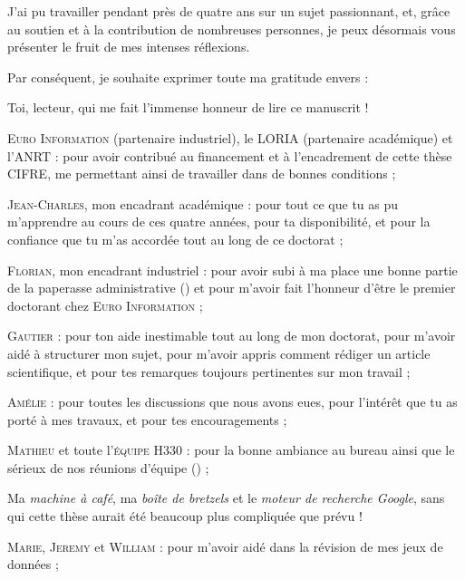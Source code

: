 \begin{ThesisAcknowledgments}

	J'ai pu travailler pendant près de quatre ans sur un sujet passionnant, et, grâce au soutien et à la contribution de nombreuses personnes, je peux désormais vous présenter le fruit de mes intenses réflexions.
	
	Par conséquent, je souhaite exprimer toute ma gratitude envers :
	\begin{todolist}
		\item[\itemok] Toi, lecteur, qui me fait l'immense honneur de lire ce manuscrit ! \faThumbsUp
		\item[\itemok] \textsc{Euro Information} (partenaire industriel), le \textsc{LORIA} (partenaire académique) et l'\textsc{ANRT} :
		pour avoir contribué au financement et à l’encadrement de cette thèse CIFRE, me permettant ainsi de travailler dans de bonnes conditions ;
		\item[\itemok] \textsc{Jean-Charles}, mon encadrant académique :
		pour tout ce que tu as pu m'apprendre au cours de ces quatre années, pour ta disponibilité, et pour la confiance que tu m'as accordée tout au long de ce doctorat ;
		\item[\itemok] \textsc{Florian}, mon encadrant industriel :
		pour avoir subi à ma place une bonne partie de la paperasse administrative (\faGrinTongueWink) et pour m'avoir fait l'honneur d'être le premier doctorant chez \textsc{Euro Information} ;
		\item[\itemok] \textsc{Gautier} :
		pour ton aide inestimable tout au long de mon doctorat, pour m'avoir aidé à structurer mon sujet, pour m'avoir appris comment rédiger un article scientifique, et pour tes remarques toujours pertinentes sur mon travail ;
		\item[\itemok] \textsc{Amélie} : pour toutes les discussions que nous avons eues, pour l’intérêt que tu as porté à mes travaux, et pour tes encouragements ;
		\item[\itemok] \textsc{Mathieu} et toute l'\textsc{équipe H330} : pour la bonne ambiance au bureau ainsi que le sérieux de nos réunions d'équipe (\faGrinTongueWink) ;
		\item[\itemok] Ma \textit{machine à café}, ma \textit{boîte de bretzels} et le \textit{moteur de recherche Google}, sans qui cette thèse aurait été beaucoup plus compliquée que prévu ! \faGrinBeamSweat
		\item[\itemok] \textsc{Marie}, \textsc{Jeremy} et \textsc{William} : pour m'avoir aidé dans la révision de mes jeux de données ;

\end{todolist}
\end{ThesisAcknowledgments}
